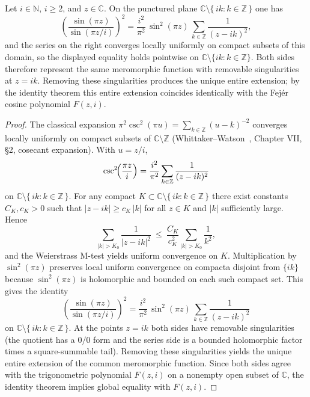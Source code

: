 \begin{proposition}\label{prop:RPF}
Let $i\in\mathbb{N}$, $i\ge 2$, and $z\in\mathbb{C}$. On the punctured plane $\mathbb{C}\setminus\{\,i k: k\in\mathbb{Z}\,\}$ one has
\[
\left(\frac{\sin(\pi z)}{\sin(\pi z/i)}\right)^{\!2}
=\frac{i^{2}}{\pi^{2}}\,\sin^{2}(\pi z)\,\sum_{k\in\mathbb{Z}}\frac{1}{(z-i k)^{2}},
\]
and the series on the right converges locally uniformly on compact subsets of this domain, so the displayed equality holds pointwise on $\mathbb{C}\setminus\{i k:k\in\mathbb{Z}\}$. Both sides therefore represent the same meromorphic function with removable singularities at $z=i k$. Removing these singularities produces the unique entire extension; by the identity theorem this entire extension coincides identically with the Fejér cosine polynomial $F(z,i)$.
\end{proposition}

\begin{proof}
The classical expansion $\pi^{2}\csc^{2}(\pi u)=\sum_{k\in\mathbb{Z}}(u-k)^{-2}$ converges locally uniformly on compact subsets of $\mathbb{C}\setminus\mathbb{Z}$ (Whittaker–Watson~\cite{whittaker1927}, Chapter VII, §2, cosecant expansion). With $u=z/i$,
\[
\csc^{2}\!\Bigl(\frac{\pi z}{i}\Bigr)=\frac{i^{2}}{\pi^{2}}\sum_{k\in\mathbb{Z}}\frac{1}{(z-i k)^{2}}
\]
on $\mathbb{C}\setminus\{\,i k: k\in\mathbb{Z}\,\}$. For any compact $K\subset\mathbb{C}\setminus\{\,i k: k\in\mathbb{Z}\,\}$ there exist constants $C_K,c_K>0$ such that $|z-i k|\ge c_K\,|k|$ for all $z\in K$ and $|k|$ sufficiently large. Hence
\[
\sum_{|k|>K_0}\frac{1}{|z-i k|^{2}}\ \le\ \frac{C_K}{c_K^{2}}\sum_{|k|>K_0}\frac{1}{k^{2}},
\]
and the Weierstrass M-test yields uniform convergence on $K$. Multiplication by $\sin^{2}(\pi z)$ preserves local uniform convergence on compacta disjoint from $\{i k\}$ because $\sin^{2}(\pi z)$ is holomorphic and bounded on each such compact set. This gives the identity
\[
\left(\frac{\sin(\pi z)}{\sin(\pi z/i)}\right)^{\!2}
=\frac{i^{2}}{\pi^{2}}\,\sin^{2}(\pi z)\,\sum_{k\in\mathbb{Z}}\frac{1}{(z-i k)^{2}}
\]
on $\mathbb{C}\setminus\{\,i k: k\in\mathbb{Z}\,\}$. At the points $z=i k$ both sides have removable singularities (the quotient has a $0/0$ form and the series side is a bounded holomorphic factor times a square-summable tail). Removing these singularities yields the unique entire extension of the common meromorphic function. Since both sides agree with the trigonometric polynomial $F(z,i)$ on a nonempty open subset of $\mathbb{C}$, the identity theorem implies global equality with $F(z,i)$.
\end{proof}


